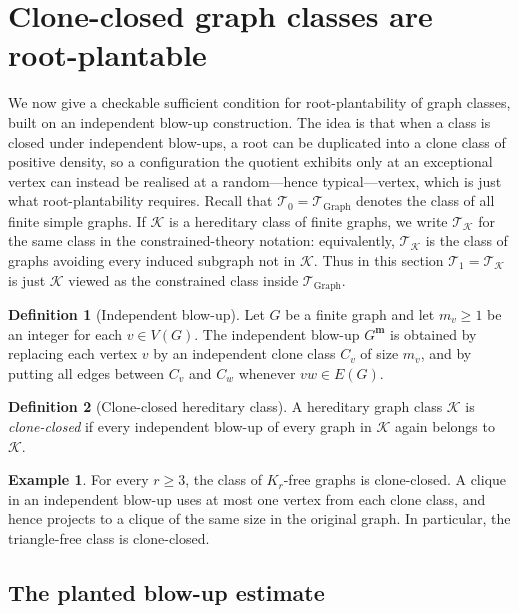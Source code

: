 \documentclass[11pt]{article}
\theoremstyle{definition}
\newtheorem{definition}[definition]{Definition}
\newtheorem{example}[example]{Example}
\newcommand{\K}{\mathcal{K}}
\newcommand{\T}{\mathcal{T}}
\begin{document}
\section{Clone-closed graph classes are root-plantable}

We now give a checkable sufficient condition for root-plantability of graph
classes, built on an independent blow-up construction.  The idea is that when a class is
closed under independent blow-ups, a root can be duplicated into a clone class
of positive density, so a configuration the quotient exhibits only at an exceptional vertex
can instead be realised at a random---hence typical---vertex, which is just what
root-plantability requires.  Recall that $\T_0=\T_{\mathrm{Graph}}$ denotes the class of
all finite simple graphs.  If $\K$ is a hereditary class of finite graphs, we write
$\T_\K$ for the same class in the constrained-theory notation: equivalently, $\T_\K$
is the class of graphs avoiding every induced subgraph not in $\K$.  Thus in this
section $\T_1=\T_\K$ is just $\K$ viewed as the constrained class inside
$\T_{\mathrm{Graph}}$.

\begin{definition}[Independent blow-up]\label{def:independent-blow-up}
Let $G$ be a finite graph and let $m_v\ge1$ be an integer for each
$v\in V(G)$.  The independent blow-up $G^{\mathbf m}$ is obtained by replacing
each vertex $v$ by an independent clone class $C_v$ of size $m_v$, and by putting
all edges between $C_v$ and $C_w$ whenever $vw\in E(G)$.
\end{definition}

\begin{definition}[Clone-closed hereditary class]
A hereditary graph class $\K$ is \emph{clone-closed} if every independent
blow-up of every graph in $\K$ again belongs to $\K$.
\end{definition}

\begin{example}
For every $r\ge3$, the class of $K_r$-free graphs is clone-closed.  A clique in
an independent blow-up uses at most one vertex from each clone class, and hence
projects to a clique of the same size in the original graph.  In particular, the
triangle-free class is clone-closed.
\end{example}

\subsection{The planted blow-up estimate}
\end{document}
